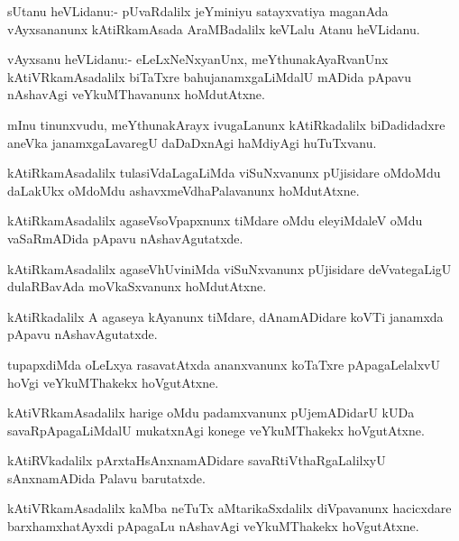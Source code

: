 \begin{mng}
sUtanu heVLidanu:- pUvaRdalilx jeYminiyu satayxvatiya maganAda vAyxsananunx kAtiRkamAsada AraMBadalilx keVLalu Atanu heVLidanu.
\end{mng}

\begin{mng}
vAyxsanu heVLidanu:- eLeLxNeNxyanUnx, meYthunakAyaRvanUnx kAtiVRkamAsadalilx biTaTxre bahujanamxgaLiMdalU mADida pApavu nAshavAgi veYkuMThavanunx hoMdutAtxne.
\end{mng}

\begin{mng}
mInu tinunxvudu, meYthunakArayx ivugaLanunx kAtiRkadalilx biDadidadxre aneVka janamxgaLavaregU daDaDxnAgi haMdiyAgi huTuTxvanu.
\end{mng}

\begin{mng}
kAtiRkamAsadalilx tulasiVdaLagaLiMda viSuNxvanunx pUjisidare oMdoMdu daLakUkx oMdoMdu ashavxmeVdhaPalavanunx hoMdutAtxne.
\end{mng}

\begin{mng}
kAtiRkamAsadalilx agaseVsoVpapxnunx tiMdare oMdu eleyiMdaleV oMdu vaSaRmADida pApavu nAshavAgutatxde.
\end{mng}

\begin{mng}
kAtiRkamAsadalilx agaseVhUviniMda viSuNxvanunx pUjisidare deVvategaLigU dulaRBavAda moVkaSxvanunx hoMdutAtxne.
\end{mng}

\begin{mng}
kAtiRkadalilx A agaseya kAyanunx tiMdare, dAnamADidare koVTi janamxda pApavu nAshavAgutatxde.
\end{mng}

\begin{mng}
tupapxdiMda oLeLxya rasavatAtxda ananxvanunx koTaTxre pApagaLelalxvU hoVgi veYkuMThakekx hoVgutAtxne.
\end{mng}

\begin{mng}
kAtiVRkamAsadalilx harige oMdu padamxvanunx pUjemADidarU kUDa savaRpApagaLiMdalU mukatxnAgi konege veYkuMThakekx hoVgutAtxne.
\end{mng}

\begin{mng}
kAtiRVkadalilx pArxtaHsAnxnamADidare savaRtiVthaRgaLalilxyU sAnxnamADida Palavu barutatxde.
\end{mng}

\begin{mng}
kAtiVRkamAsadalilx kaMba neTuTx aMtarikaSxdalilx diVpavanunx hacicxdare barxhamxhatAyxdi pApagaLu nAshavAgi veYkuMThakekx hoVgutAtxne.
\end{mng}

